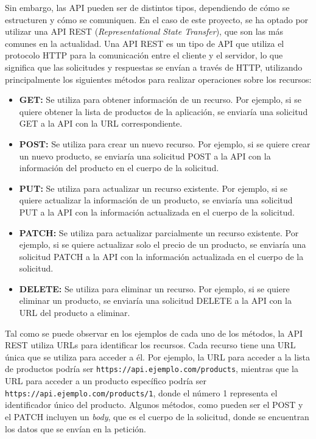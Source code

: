 Sin embargo, las API pueden ser de distintos tipos, dependiendo de cómo se estructuren y cómo se comuniquen. En el caso de este proyecto, se ha optado por utilizar una API REST (\textit{Representational State Transfer}), que son las más comunes en la actualidad. Una API REST es un tipo de API que utiliza el protocolo HTTP para la comunicación entre el cliente y el servidor, lo que significa que las solicitudes y respuestas se envían a través de HTTP, utilizando principalmente los siguientes métodos para realizar operaciones sobre los recursos:

\begin{itemize}
    \item \textbf{GET:} Se utiliza para obtener información de un recurso. Por ejemplo, si se quiere obtener la lista de productos de la aplicación, se enviaría una solicitud GET a la API con la URL correspondiente.
    \item \textbf{POST:} Se utiliza para crear un nuevo recurso. Por ejemplo, si se quiere crear un nuevo producto, se enviaría una solicitud POST a la API con la información del producto en el cuerpo de la solicitud.
    \item \textbf{PUT:} Se utiliza para actualizar un recurso existente. Por ejemplo, si se quiere actualizar la información de un producto, se enviaría una solicitud PUT a la API con la información actualizada en el cuerpo de la solicitud.
    \item \textbf{PATCH:} Se utiliza para actualizar parcialmente un recurso existente. Por ejemplo, si se quiere actualizar solo el precio de un producto, se enviaría una solicitud PATCH a la API con la información actualizada en el cuerpo de la solicitud.
    \item \textbf{DELETE:} Se utiliza para eliminar un recurso. Por ejemplo, si se quiere eliminar un producto, se enviaría una solicitud DELETE a la API con la URL del producto a eliminar.
\end{itemize}

Tal como se puede observar en los ejemplos de cada uno de los métodos, la API REST utiliza URLs para identificar los recursos. Cada recurso tiene una URL única que se utiliza para acceder a él. Por ejemplo, la URL para acceder a la lista de productos podría ser \texttt{https://api.ejemplo.com/products}, mientras que la URL para acceder a un producto específico podría ser \texttt{https://api.ejemplo.com/products/1}, donde el número 1 representa el identificador único del producto. Algunos métodos, como pueden ser el POST y el PATCH incluyen un \textit{body}, que es el cuerpo de la solicitud, donde se encuentran los datos que se envían en la petición.


